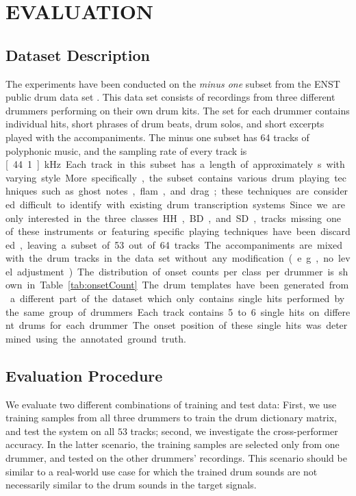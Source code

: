 \documentclass[a4paper]{article}
\newcommand{\tabref}[1]{\mbox{Table~\ref{#1}}}
\newcommand{\figref}[1]{\mbox{Figure~\ref{#1}}}
\begin{document}
\section{EVALUATION}\label{sec:Evaluation}
\subsection{Dataset Description}\label{subsec:data set description}

The experiments have been conducted on the \textit{minus one} subset from the ENST public drum data set \cite{gillet_enst-drums:_2006}. This data set consists of recordings from three different drummers performing on their own drum kits. The set for each drummer contains individual hits, short phrases of drum beats, drum solos, and short excerpts played with the accompaniments. The minus one subset has 64 tracks of polyphonic music, and the sampling rate of every track is \unit[44.1]{kHz}. Each track in this subset has a length of approximately \unit[70]{s} with varying style. More specifically, the subset contains various drum playing techniques such as ghost notes, flam, and drag; these techniques are considered difficult to identify with existing drum transcription systems. Since we are only interested in the three classes HH, BD, and SD, tracks missing one of these instruments or featuring specific playing techniques have been discarded, leaving a subset of 53 out of 64 tracks.

The accompaniments are mixed with the drum tracks in the data set without any modification (e.g., no level adjustment). The distribution of onset counts per class per drummer is shown in \tabref{tab:onsetCount}. %
The drum templates have been generated from a different part of the dataset which only contains single hits performed by the same group of drummers. Each track contains 5 to 6 single hits on different drums for each drummer. The onset position of these single hits was determined using the annotated ground truth. 

\subsection{Evaluation Procedure}\label{subsec:evaluation procedure}
We evaluate two different combinations of training and test data: First, we use training samples from all three drummers to train the drum dictionary matrix, and test the system on all $53$ tracks; second, we investigate the cross-performer accuracy. %
In the latter scenario, the training samples are selected only from one drummer, and tested on the other drummers' recordings. This scenario should be similar to a real-world use case for which the trained drum sounds are not necessarily similar to the drum sounds in the target signals.
\end{document}

